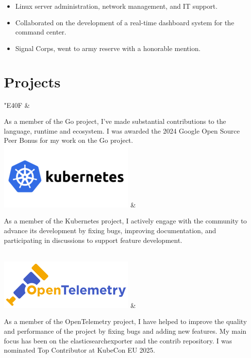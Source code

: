 \documentclass[]{cv-mauri}
\begin{document}
\begin{tabularcv}
			\begin{itemize}
				\item Linux server administration, network management, and IT support.
				\item Collaborated on the development of a real-time dashboard system for the command center.
				\item Signal Corps, went to army reserve with a honorable mention.
			\end{itemize}
\end{tabularcv}

\section*{Projects}
\begin{tabularcv}
	{\Huge \color[HTML]{76E1FE} \FAB \char"E40F} &

	As a member of the Go project, I've made substantial contributions to the language, runtime and ecosystem.
	I was awarded the 2024 Google Open Source Peer Bonus for my work on the Go project.
	\\
	\includegraphics[scale=1.5]{images/k8s.png} &

	As a member of the Kubernetes project, I actively engage with the community to advance its
	development by fixing bugs, improving documentation, and participating in discussions to support
	feature development.

	\\
	\includegraphics[scale=0.35]{images/opentelemetry.png} &

	As a member of the OpenTelemetry project, I have helped to improve the quality and
	performance of the project by fixing bugs and adding new features. My main focus has been
	on the elasticsearchexporter and the contrib repository. I was nominated Top Contributor at KubeCon EU 2025.


\end{tabularcv}
\end{document}
